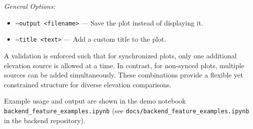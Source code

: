 \documentclass[12pt]{article}
\begin{document}
\textit{General Options:}
\begin{itemize}
  \item \texttt{--output <filename>} — Save the plot instead of displaying it.
  \item \texttt{--title <text>} — Add a custom title to the plot.
\end{itemize}

A validation is enforced such that for synchronized plots, only one additional elevation source is allowed at a time. In contrast, for non-synced plots, multiple sources can be added simultaneously. These combinations provide a flexible yet constrained structure for diverse elevation comparisons.

Example usage and output are shown in the demo notebook \texttt{backend\_feature\_examples.ipynb} (see \texttt{docs/backend\_feature\_examples.ipynb} in the backend repository).


\clearpage
\newpage
\end{document}

